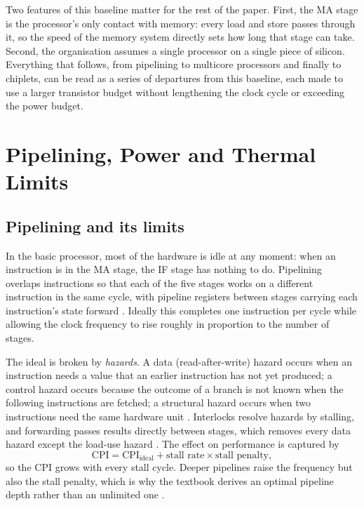 Two features of this baseline matter for the rest of the paper. First, the MA stage is the processor's only contact with memory: every load and store passes through it, so the speed of the memory system directly sets how long that stage can take. Second, the organisation assumes a single processor on a single piece of silicon. Everything that follows, from pipelining to multicore processors and finally to chiplets, can be read as a series of departures from this baseline, each made to use a larger transistor budget without lengthening the clock cycle or exceeding the power budget.

\section{Pipelining, Power and Thermal Limits}
\label{sec:pipelining-power}

\subsection{Pipelining and its limits}
In the basic processor, most of the hardware is idle at any moment: when an instruction is in the MA stage, the IF stage has nothing to do. Pipelining overlaps instructions so that each of the five stages works on a different instruction in the same cycle, with pipeline registers between stages carrying each instruction's state forward \cite[sec.~10.12.1]{sarangi2025basic}. Ideally this completes one instruction per cycle while allowing the clock frequency to rise roughly in proportion to the number of stages.

The ideal is broken by \emph{hazards}. A data (read-after-write) hazard occurs when an instruction needs a value that an earlier instruction has not yet produced; a control hazard occurs because the outcome of a branch is not known when the following instructions are fetched; a structural hazard occurs when two instructions need the same hardware unit \cite[sec.~10.4]{sarangi2025basic}. Interlocks resolve hazards by stalling, and forwarding passes results directly between stages, which removes every data hazard except the load-use hazard \cite[sec.~10.12.1]{sarangi2025basic}. The effect on performance is captured by
\begin{equation}
  \mathrm{CPI} = \mathrm{CPI}_{\mathrm{ideal}} + \text{stall rate} \times \text{stall penalty},
  \label{eq:cpi-stalls}
\end{equation}
so the CPI grows with every stall cycle. Deeper pipelines raise the frequency but also the stall penalty, which is why the textbook derives an optimal pipeline depth rather than an unlimited one \cite[sec.~10.9.3]{sarangi2025basic}.

